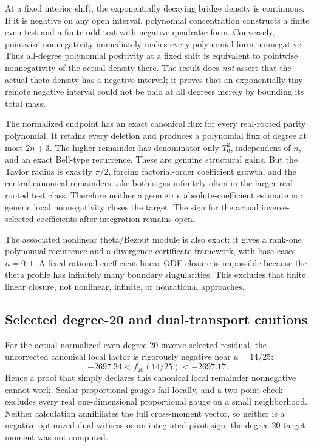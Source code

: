 \documentclass[11pt]{article}
\theoremstyle{definition}
\theoremstyle{remark}
\begin{document}
At a fixed interior shift, the exponentially decaying bridge density is
continuous. If it is negative on any open interval, polynomial concentration
constructs a finite even test and a finite odd test with negative quadratic
form. Conversely, pointwise nonnegativity immediately makes every polynomial
form nonnegative. Thus all-degree polynomial positivity at a fixed shift is
equivalent to pointwise nonnegativity of the actual density there. The result
does \emph{not} assert that the actual theta density has a negative interval;
it proves that an exponentially tiny remote negative interval could not be
paid at all degrees merely by bounding its total mass.

The normalized endpoint has an exact canonical flux for every real-rooted
parity polynomial. It retains every deletion and produces a polynomial flux
of degree at most $2n+3$. The higher remainder has denominator only $T_0^2$,
independent of $n$, and an exact Bell-type recurrence. These are genuine
structural gains. But the Taylor radius is exactly $\pi/2$, forcing
factorial-order coefficient growth, and the central canonical remainders take
both signs infinitely often in the larger real-rooted test class. Therefore
neither a geometric absolute-coefficient estimate nor generic local
nonnegativity closes the target. The sign for the actual inverse-selected
coefficients after integration remains open.

The associated nonlinear theta/Bezout module is also exact: it gives a
rank-one polynomial recurrence and a divergence-certificate framework, with
base cases $n=0,1$. A fixed rational-coefficient linear ODE closure is
impossible because the theta profile has infinitely many boundary
singularities. This excludes that finite linear closure, not nonlinear,
infinite, or nonrational approaches.

\subsection{Selected degree-20 and dual-transport cautions}

For the actual normalized even degree-20 inverse-selected residual, the
uncorrected canonical local factor is rigorously negative near $u=14/25$:
\begin{equation}
 -2697.34<f_{20}(14/25)<-2697.17.
 \label{eq:v33-selected20-local}
\end{equation}
Hence a proof that simply declares this canonical local remainder nonnegative
cannot work. Scalar proportional gauges fail locally, and a two-point check
excludes every real one-dimensional proportional gauge on a small
neighborhood. Neither calculation annihilates the full cross-moment vector,
so neither is a negative optimized-dual witness or an integrated pivot sign;
the degree-20 target moment was not computed.
\end{document}
